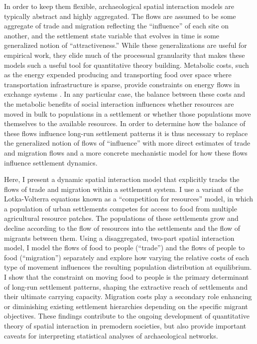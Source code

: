 \documentclass{article}
\begin{document}
In order to keep them flexible, archaeological spatial interaction models are typically abstract and highly aggregated. The flows are assumed to be some aggregate of trade and migration reflecting the ``influence'' of each site on another, and the settlement state variable that evolves in time is some generalized notion of ``attractiveness.'' While these generalizations are useful for empirical work, they elide much of the processual granularity that makes these models such a useful tool for quantitative theory building. Metabolic costs, such as the energy expended producing and transporting food over space where transportation infrastructure is sparse, provide constraints on energy flows in exchange systems \parencite{Drennan1984,Verhagen2019ModellingApproaches}. In any particular case, the balance between these costs and the metabolic benefits of social interaction influences whether resources are moved in bulk to populations in a settlement or whether those populations move themselves to the available resources. In order to determine how the balance of these flows influence long-run settlement patterns it is thus necessary to replace the generalized notion of flows of ``influence'' with more direct estimates of trade and migration flows and a more concrete mechanistic model for how these flows influence settlement dynamics.

Here, I present a dynamic spatial interaction model that explicitly tracks the flows of trade and migration within a settlement system. I use a variant of the Lotka-Volterra equations known as a ``competition for resources'' model, in which a population of urban settlements competes for access to food from multiple agricultural resource patches. The populations of these settlements grow and decline according to the flow of resources into the settlements and the flow of migrants between them. Using a disaggregated, two-part spatial interaction model, I model the flows of food to people (``trade'') and the flows of people to food (``migration'') separately and explore how varying the relative costs of each type of movement influences the resulting population distribution at equilibrium. I show that the constraint on moving food to people is the primary determinant of long-run settlement patterns, shaping the extractive reach of settlements and their ultimate carrying capacity. Migration costs play a secondary role enhancing or diminishing existing settlement hierarchies depending on the specific migrant objectives. These findings contribute to the ongoing development of quantitative theory of spatial interaction in premodern societies, but also provide important caveats for interpreting statistical analyses of archaeological networks.
\end{document}

